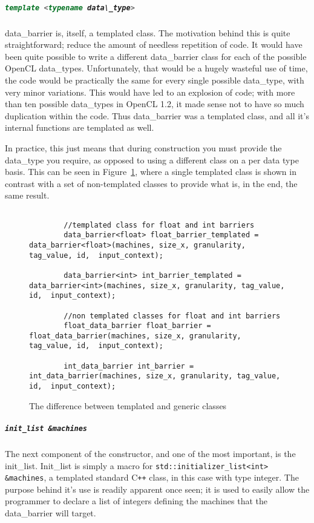 \documentclass[report.tex]{subfiles}
\begin{document}
  \subparagraph{\lstinline[language=cpp]{template <typename data\_type>}} %
  \label{subp:template_typename_data_type}
    data\_barrier is, itself, a templated class. The motivation behind this is quite straightforward; reduce the amount of needless repetition of code. It would have been quite possible to write a different data\_barrier class for each of the possible OpenCL data\_types. Unfortunately, that would be a hugely wasteful use of time, the code would be practically the same for every single possible data\_type, with very minor variations. This would have led to an explosion of code; with more than ten possible data\_types \cite{opencldatatypes} in OpenCL 1.2, it made sense not to have so much duplication within the code. Thus data\_barrier was a templated class, and all it's internal functions are templated as well.

    In practice, this just means that during construction you must provide the data\_type you require, as opposed to using a different class on a per data type basis. This can be seen in Figure~\ref{fig:templated_vs_non_templated}, where a single templated class is shown in contrast with a set of non-templated classes to provide what is, in the end, the same result.

    \begin{figure}[htbp]
      \centering

      \lstset{language=cpp}  
      \begin{lstlisting}[tabsize=2]

        //templated class for float and int barriers
        data_barrier<float> float_barrier_templated = data_barrier<float>(machines, size_x, granularity, tag_value, id,  input_context);

        data_barrier<int> int_barrier_templated = data_barrier<int>(machines, size_x, granularity, tag_value, id,  input_context);

        //non templated classes for float and int barriers
        float_data_barrier float_barrier = float_data_barrier(machines, size_x, granularity, tag_value, id,  input_context);

        int_data_barrier int_barrier = int_data_barrier(machines, size_x, granularity, tag_value, id,  input_context);
        \end{lstlisting}

      \caption{The difference between templated and generic classes}
      \label{fig:templated_vs_non_templated}
    \end{figure}
  \subparagraph{\texttt{init\_list \&machines}} %
  \label{subp:init_list}
    The next component of the constructor, and one of the most important, is the init\_list. Init\_list is simply a macro for \newline\texttt{std::initializer\_list<int> \&machines}, a templated standard C\texttt{++} class, in this case with type integer. The purpose behind it's use is readily apparent once seen; it is used to easily allow the programmer to declare a list of integers defining the machines that the data\_barrier will target.
\end{document}
